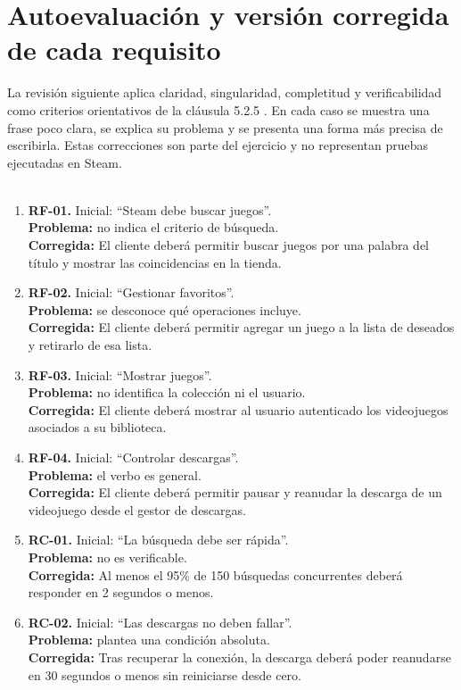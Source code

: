 \documentclass[12pt,a4paper]{article}
\begin{document}
\section{Autoevaluación y versión corregida de cada requisito}

La revisión siguiente aplica claridad, singularidad, completitud y verificabilidad como criterios orientativos de la cláusula 5.2.5 \cite{iso29148}. En cada caso se muestra una frase poco clara, se explica su problema y se presenta una forma más precisa de escribirla. Estas correcciones son parte del ejercicio y no representan pruebas ejecutadas en Steam.
\\\\
\begin{enumerate}[leftmargin=*,itemsep=8pt]
\item \textbf {RF-01.} Inicial: ``Steam debe buscar juegos''. \\ \textbf{Problema:} no indica el criterio de búsqueda. \\ \textbf{Corregida:} El cliente deberá permitir buscar juegos por una palabra del título y mostrar las coincidencias en la tienda.
\item \textbf{RF-02.} Inicial: ``Gestionar favoritos''. \\\textbf{Problema:} se desconoce qué operaciones incluye. \\ \textbf{Corregida:} El cliente deberá permitir agregar un juego a la lista de deseados y retirarlo de esa lista.
\item \textbf{RF-03.} Inicial: ``Mostrar juegos''. \\\textbf{Problema:} no identifica la colección ni el usuario. \\\textbf{Corregida:} El cliente deberá mostrar al usuario autenticado los videojuegos asociados a su biblioteca.
\item \textbf{RF-04.} Inicial: ``Controlar descargas''.\\ \textbf{Problema:} el verbo es general. \\ \textbf{Corregida:} El cliente deberá permitir pausar y reanudar la descarga de un videojuego desde el gestor de descargas.
\item \textbf{RC-01.} Inicial: ``La búsqueda debe ser rápida''. \\\textbf{Problema:} no es verificable. \\\textbf{Corregida:} Al menos el 95\% de 150 búsquedas concurrentes deberá responder en 2 segundos o menos.
\item \textbf{RC-02.} Inicial: ``Las descargas no deben fallar''. \\\textbf{Problema:} plantea una condición absoluta. \\\textbf{Corregida:} Tras recuperar la conexión, la descarga deberá poder reanudarse en 30 segundos o menos sin reiniciarse desde cero.

\end{enumerate}
\end{document}
